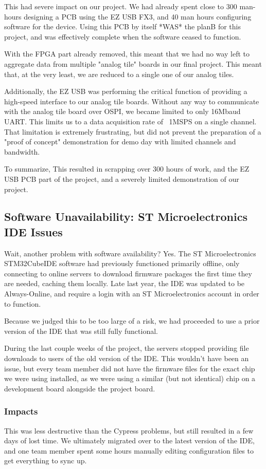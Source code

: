 This had severe impact on our project. We had already spent close to 300 man-hours designing a PCB using the EZ USB FX3, and 40 man hours configuring software for the device. Using this PCB by itself *WAS* the planB for this project, and was effectively complete when the software ceased to function.

With the FPGA part already removed, this meant that we had no way left to aggregate data from multiple "analog tile" boards in our final project. This meant that, at the very least, we are reduced to a single one of our analog tiles.

Additionally, the EZ USB was performing the critical function of providing a high-speed interface to our analog tile boards. Without any way to communicate with the analog tile board over OSPI, we became limited to only 16Mbaud UART. This limits us to a data acquisition rate of ~1MSPS on a single channel. That limitation is extremely frustrating, but did not prevent the preparation of a "proof of concept" demonstration for demo day with limited channels and bandwidth.

To summarize, This resulted in scrapping over 300 hours of work, and the EZ USB PCB part of the project, and a severely limited demonstration of our project.

\subsection{Software Unavailability: ST Microelectronics IDE Issues}
Wait, another problem with software availability? Yes. The ST Microelectronics STM32CubeIDE software had previously functioned primarily offline, only connecting to online servers to download firmware packages the first time they are needed, caching them locally. Late last year, the IDE was updated to be Always-Online, and require a login with an ST Microelectronics account in order to function. 

Because we judged this to be too large of a risk, we had proceeded to use a prior version of the IDE that was still fully functional.

During the last couple weeks of the project, the servers stopped providing file downloads to users of the old version of the IDE. This wouldn't have been an issue, but every team member did not have the firmware files for the exact chip we were using installed, as we were using a similar (but not identical) chip on a development board alongside the project board.

\subsubsection{Impacts}
This was less destructive than the Cypress problems, but still resulted in a few days of lost time. We ultimately migrated over to the latest version of the IDE, and one team member spent some hours manually editing configuration files to get everything to sync up.

